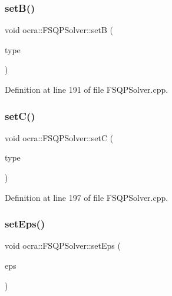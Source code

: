 \subsubsection{\texorpdfstring{set\+B()}{setB()}}
{\footnotesize\ttfamily void ocra\+::\+F\+S\+Q\+P\+Solver\+::setB (\begin{DoxyParamCaption}\item[{\hyperlink{classocra_1_1FSQPSolver_ad43d4e2dae6954df05123077cea0b7f5}{e\+Fsqp\+Algo}}]{type }\end{DoxyParamCaption})}



Definition at line 191 of file F\+S\+Q\+P\+Solver.\+cpp.

\hypertarget{classocra_1_1FSQPSolver_a452ec55df7f57747876dbfe99d8595e1}{}\label{classocra_1_1FSQPSolver_a452ec55df7f57747876dbfe99d8595e1} 
\subsubsection{\texorpdfstring{set\+C()}{setC()}}
{\footnotesize\ttfamily void ocra\+::\+F\+S\+Q\+P\+Solver\+::setC (\begin{DoxyParamCaption}\item[{\hyperlink{classocra_1_1FSQPSolver_a0569ab06022ffef1bd6d97599a5e4279}{e\+Fsqp\+Evaluation\+Domain\+Policy}}]{type }\end{DoxyParamCaption})}



Definition at line 197 of file F\+S\+Q\+P\+Solver.\+cpp.

\hypertarget{classocra_1_1FSQPSolver_aba76d5017ed117ec8314f801eb3dd348}{}\label{classocra_1_1FSQPSolver_aba76d5017ed117ec8314f801eb3dd348} 
\subsubsection{\texorpdfstring{set\+Eps()}{setEps()}\hspace{0.1cm}{\footnotesize\ttfamily [1/2]}}
{\footnotesize\ttfamily void ocra\+::\+F\+S\+Q\+P\+Solver\+::set\+Eps (\begin{DoxyParamCaption}\item[{double}]{eps }\end{DoxyParamCaption})}



